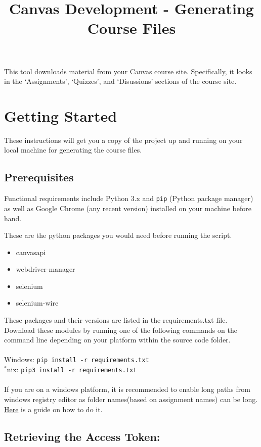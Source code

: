 \documentclass{article}
\date{}
\title{Canvas Development - Generating Course
Files}
\begin{document}
\maketitle
This tool downloads material from your Canvas course site. Specifically,
it looks in the `Assignments', `Quizzes', and `Disussions' sections of
the course site.

\section{Getting Started}

These instructions will get you a copy of the project up and running on
your local machine for generating the course files.

\subsection{Prerequisites}

Functional requirements include Python 3.x and \texttt{pip} (Python
package manager) as well as Google Chrome (any recent version) installed
on your machine before hand.

These are the python packages you would need before running the script.

\begin{itemize}
\item
  canvasapi
\item
  webdriver-manager
\item
  selenium
\item
  selenium-wire
\end{itemize}

These packages and their versions are listed in the requirements.txt file. Download these modules by running one of the following commands on the
command line depending on your platform within the source code folder.
\\\\Windows: \texttt{pip\ install\ -r\ requirements.txt}
\\$^*$nix: \texttt{pip3\ install\ -r\ requirements.txt}
\\\\If you are on a windows platform, it is recommended to enable long paths from windows registry editor as folder names(based on assignment names) can be long. \href{https://www.howtogeek.com/266621/how-to-make-windows-10-accept-file-paths-over-260-characters/}{Here} is a guide on how to do it.

\subsection{Retrieving the Access
Token:}
\end{document}
